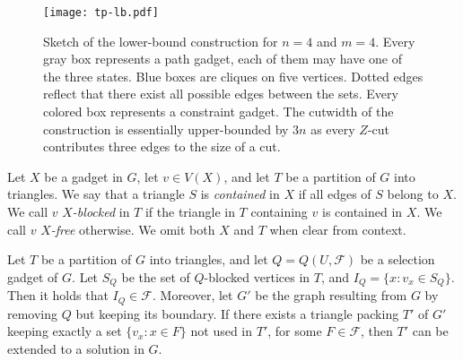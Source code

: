 \documentclass[a4paper,UKenglish,cleveref, autoref, thm-restate]{lipics-v2021}
\begin{document}
\begin{figure}[t] 
    \centering
    \texttt{[image: tp-lb.pdf]}
    \caption{Sketch of the lower-bound construction for $n = 4$ and $m = 4$. Every gray box represents a path gadget, each of them may have one of the three states. Blue boxes are cliques on five vertices. Dotted edges reflect that there exist all possible edges between the sets. Every colored box represents a constraint gadget. The cutwidth of the construction is essentially upper-bounded by $3 n$ as every $Z$-cut contributes three edges to the size of a cut.}
    \label{fig:tp-lb}
\end{figure}

\begin{definition}
    Let $X$ be a gadget in $G$, let $v\in V(X)$, and let $T$ be a partition of $G$ into triangles. 
    We say that a triangle $S$ is \emph{contained} in $X$ if all edges of $S$ belong to $X$.
    We call $v$ \emph{$X$-blocked} in $T$ if the triangle in $T$ containing $v$ is contained in $X$. 
    We call $v$ \emph{$X$-free} otherwise.
    We omit both $X$ and $T$ when clear from context.
\end{definition}

\begin{lemma}\label{tripack-lb::lem:state-selection-gadget}
    Let $T$ be a partition of $G$ into triangles, and let $Q = Q(U, \mathcal{F})$ be a selection gadget of $G$. Let $S_Q$ be the set of $Q$-blocked vertices in $T$, and $I_Q = \{x \colon v_x \in S_Q\}$. Then it holds that $I_Q\in \mathcal{F}$. Moreover, let $G'$ be the graph resulting from $G$ by removing $Q$ but keeping its boundary. If there exists a triangle packing $T'$ of $G'$ keeping exactly a set $\{v_x \colon x \in F\}$ not used in $T'$, for some $F\in \mathcal{F}$, then $T'$ can be extended to a solution in $G$.
\end{lemma}
\end{document}
